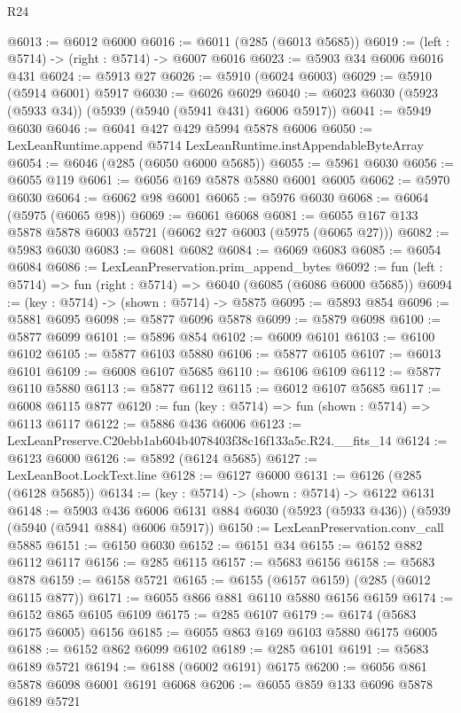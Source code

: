 \begin{lexlean}{R24}
\begin{coremodule}
@6013 := @6012 @6000
@6016 := @6011 (@285 (@6013 @5685))
@6019 := (left : @5714) -> (right : @5714) -> @6007 @6016
@6023 := @5903 @34 @6006 @6016 @431
@6024 := @5913 @27
@6026 := @5910 (@6024 @6003)
@6029 := @5910 (@5914 @6001) @5917
@6030 := @6026 @6029
@6040 := @6023 @6030 (@5923 (@5933 @34)) (@5939 (@5940 (@5941 @431) @6006 @5917))
@6041 := @5949 @6030
@6046 := @6041 @427 @429 @5994 @5878 @6006
@6050 := LexLeanRuntime.append @5714 LexLeanRuntime.instAppendableByteArray
@6054 := @6046 (@285 (@6050 @6000 @5685))
@6055 := @5961 @6030
@6056 := @6055 @119
@6061 := @6056 @169 @5878 @5880 @6001 @6005
@6062 := @5970 @6030
@6064 := @6062 @98 @6001
@6065 := @5976 @6030
@6068 := @6064 (@5975 (@6065 @98))
@6069 := @6061 @6068
@6081 := @6055 @167 @133 @5878 @5878 @6003 @5721 (@6062 @27 @6003 (@5975 (@6065 @27)))
@6082 := @5983 @6030
@6083 := @6081 @6082
@6084 := @6069 @6083
@6085 := @6054 @6084
@6086 := LexLeanPreservation.prim_append_bytes
@6092 := fun (left : @5714) => fun (right : @5714) => @6040 (@6085 (@6086 @6000 @5685))
@6094 := (key : @5714) -> (shown : @5714) -> @5875
@6095 := @5893 @854
@6096 := @5881 @6095
@6098 := @5877 @6096 @5878
@6099 := @5879 @6098
@6100 := @5877 @6099
@6101 := @5896 @854
@6102 := @6009 @6101
@6103 := @6100 @6102
@6105 := @5877 @6103 @5880
@6106 := @5877 @6105
@6107 := @6013 @6101
@6109 := @6008 @6107 @5685
@6110 := @6106 @6109
@6112 := @5877 @6110 @5880
@6113 := @5877 @6112
@6115 := @6012 @6107 @5685
@6117 := @6008 @6115 @877
@6120 := fun (key : @5714) => fun (shown : @5714) => @6113 @6117
@6122 := @5886 @436 @6006
@6123 := LexLeanPreserve.C20ebb1ab604b4078403f38c16f133a5c.R24.__fits_14
@6124 := @6123 @6000
@6126 := @5892 (@6124 @5685)
@6127 := LexLeanBoot.LockText.line
@6128 := @6127 @6000
@6131 := @6126 (@285 (@6128 @5685))
@6134 := (key : @5714) -> (shown : @5714) -> @6122 @6131
@6148 := @5903
    @436
    @6006
    @6131
    @884
    @6030
    (@5923 (@5933 @436))
    (@5939 (@5940 (@5941 @884) @6006 @5917))
@6150 := LexLeanPreservation.conv_call @5885
@6151 := @6150 @6030
@6152 := @6151 @34
@6155 := @6152 @882 @6112 @6117
@6156 := @285 @6115
@6157 := @5683 @6156
@6158 := @5683 @878
@6159 := @6158 @5721
@6165 := @6155 (@6157 @6159) (@285 (@6012 @6115 @877))
@6171 := @6055 @866 @881 @6110 @5880 @6156 @6159
@6174 := @6152 @865 @6105 @6109
@6175 := @285 @6107
@6179 := @6174 (@5683 @6175 @6005) @6156
@6185 := @6055 @863 @169 @6103 @5880 @6175 @6005
@6188 := @6152 @862 @6099 @6102
@6189 := @285 @6101
@6191 := @5683 @6189 @5721
@6194 := @6188 (@6002 @6191) @6175
@6200 := @6056 @861 @5878 @6098 @6001 @6191 @6068
@6206 := @6055 @859 @133 @6096 @5878 @6189 @5721

\end{coremodule}
\end{lexlean}
